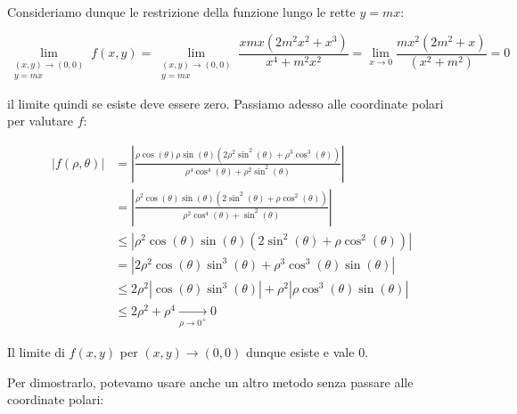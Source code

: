 Consideriamo dunque le restrizione della funzione lungo le rette \(y=mx\):

\[
    \lim_{\begin{smallmatrix}(x,y) \to (0,0) \\ y=mx\end{smallmatrix}} f(x,y) = \lim_{\begin{smallmatrix}(x,y) \to (0,0) \\ y=mx\end{smallmatrix}} \frac{xmx(2m^{2}x^{2}+x^{3})}{x^{4}+m^{2}x^{2}}= \lim_{ x \to 0 } \frac{mx^{2}(2m^{2}+x)}{(x^{2}+m^{2})} = 0
\]

il limite quindi se esiste deve essere zero. Passiamo adesso alle coordinate polari per valutare \(f\):

\begin{spreadlines}{3mm}
    \begin{align*}
        \left|f(\rho, \theta)\right| & = \left|\frac{\rho\cos(\theta) \rho\sin(\theta) (2\rho^{2}\sin^{2}(\theta)+\rho^{3}\cos^{3}(\theta))}{\rho^{4}\cos^{4}(\theta)+\rho^{2}\sin^{2}(\theta)}\right| \\
                                     & = \left|\frac{\rho^{2}\cos(\theta) \sin(\theta) (2\sin^{2}(\theta)+\rho \cos^{2}(\theta))}{\rho^{2}\cos^{4}(\theta)+\sin^{2}(\theta)} \right|                   \\
                                     & \le \left|\rho^{2}\cos(\theta) \sin(\theta) (2\sin^{2}(\theta)+\rho \cos^{2}(\theta))\right|                                                                    \\
                                     & = \left|2\rho^{2}\cos(\theta)\sin^3(\theta) + \rho^{3}\cos^3(\theta)\sin(\theta)\right|                                                                         \\
                                     & \le 2\rho^2|\cos(\theta)\sin^3(\theta)| + \rho^2|\rho\cos^3(\theta)\sin(\theta)|                                                                                \\
                                     & \le 2\rho^2 + \rho^4 \xrightarrow[\rho \to 0^+]{} 0
    \end{align*}
\end{spreadlines}

Il limite di \(f(x,y)\) per \((x,y) \to (0,0)\) dunque esiste e vale \(0\).

Per dimostrarlo, potevamo usare anche un altro metodo senza passare alle coordinate polari:

